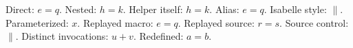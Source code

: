 \documentclass{article}
\newcommand{\eq}{$e=q$}
\newcommand{\helper}{$h=k$}
\newcommand{\authormiddle}{\helper}
\newcommand{\authorouter}{\authormiddle}
\let\alias\eq
\newcommand{\isasymparallel}{\ensuremath{\parallel}}
\newcommand{\witharg}[1]{$#1$}
\newcommand{\replay}[1]{#1}
\newcommand{\openmath}{$u}
\newcommand{\closemath}{v$}
\begin{document}
Direct: \eq.
Nested: \authorouter.
Helper itself: \helper.
Alias: \alias.
Isabelle style: \isasymparallel.
Parameterized: \witharg{x}.
Replayed macro: \replay{\eq}.
Replayed source: \replay{$r=s$}.
Source control: $\isasymparallel$.
Distinct invocations: \openmath+\closemath.
\renewcommand{\eq}{$a=b$}
Redefined: \eq.
\end{document}
